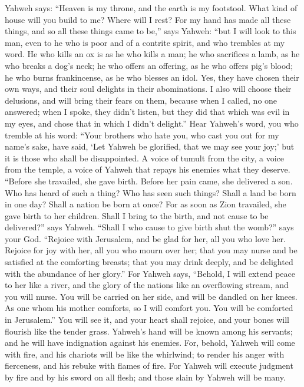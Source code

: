  Yahweh says: ``Heaven is my throne, and the earth is my
footstool. What kind of house will you build to me? Where will I rest?
 For my hand has made all these things, and so all these
things came to be,'' says Yahweh: ``but I will look to this man, even to
he who is poor and of a contrite spirit, and who trembles at my word.
 He who kills an ox is as he who kills a man; he who
sacrifices a lamb, as he who breaks a dog's neck; he who offers an
offering, as he who offers pig's blood; he who burns frankincense, as he
who blesses an idol. Yes, they have chosen their own ways, and their
soul delights in their abominations.  I also will choose
their delusions, and will bring their fears on them, because when I
called, no one answered; when I spoke, they didn't listen, but they did
that which was evil in my eyes, and chose that in which I didn't
delight.''  Hear Yahweh's word, you who tremble at his word:
``Your brothers who hate you, who cast you out for my name's sake, have
said, `Let Yahweh be glorified, that we may see your joy;' but it is
those who shall be disappointed.  A voice of tumult from the
city, a voice from the temple, a voice of Yahweh that repays his enemies
what they deserve.  ``Before she travailed, she gave birth.
Before her pain came, she delivered a son.  Who has heard of
such a thing? Who has seen such things? Shall a land be born in one day?
Shall a nation be born at once? For as soon as Zion travailed, she gave
birth to her children.  Shall I bring to the birth, and not
cause to be delivered?'' says Yahweh. ``Shall I who cause to give birth
shut the womb?'' says your God.  ``Rejoice with Jerusalem,
and be glad for her, all you who love her. Rejoice for joy with her, all
you who mourn over her;  that you may nurse and be
satisfied at the comforting breasts; that you may drink deeply, and be
delighted with the abundance of her glory.''  For Yahweh
says, ``Behold, I will extend peace to her like a river, and the glory
of the nations like an overflowing stream, and you will nurse. You will
be carried on her side, and will be dandled on her knees. 
As one whom his mother comforts, so I will comfort you. You will be
comforted in Jerusalem.''  You will see it, and your heart
shall rejoice, and your bones will flourish like the tender grass.
Yahweh's hand will be known among his servants; and he will have
indignation against his enemies.  For, behold, Yahweh will
come with fire, and his chariots will be like the whirlwind; to render
his anger with fierceness, and his rebuke with flames of fire.
 For Yahweh will execute judgment by fire and by his sword
on all flesh; and those slain by Yahweh will be many.

